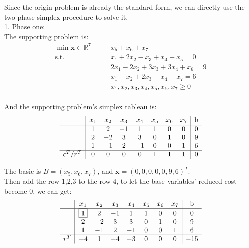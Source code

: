 \documentclass[10pt]{article}
\renewcommand{\mathbf}{\boldsymbol}
\begin{document}
Since the origin problem is already the standard form, we can directly use the two-phase simplex procedure to solve it.\\
1. Phase one:\\
The supporting problem is:\\
\begin{equation}
	\begin{aligned}
		\min{\bm{x} \in \mathbb{R}^{7}}\qquad & x_5 + x_6 + x_7 \\
		\mathrm{s.t.}\qquad & x_{1} + 2x_{2} - x_{3} + x_{4} + x_5 = 0 \\
							& 2x_{1} - 2x_{2} + 3x_{3} + 3x_{4} + x_6 = 9 \\
							& x_{1} - x_{2} + 2x_{3} - x_{4} + x_7 = 6 \\
							& x_{1}, x_{2}, x_{3}, x_{4}, x_5, x_6, x_7 \geq 0 \\
	\end{aligned}
\end{equation}

And the supporting problem's simplex tableau is:\\
\begin{equation}
	\begin{aligned}
		\begin{array}{c|ccccccc|c}
			& x_1 & x_2 & x_3 & x_4 & x_5 & x_6 & x_7 & \text{b} \\
			\hline
			& 1 & 2 & -1 & 1 & 1 & 0 & 0 & 0 \\
			& 2 & -2 & 3 & 3 & 0 & 1 & 0 & 9 \\
			& 1 & -1 & 2 & -1 & 0 & 0 & 1 & 6 \\
			\hline
			c^T/r^T & 0 & 0 & 0 & 0 & 1 & 1 & 1 & 0 \\
		\end{array}
	\end{aligned}
\end{equation}

The basic is $B=(x_5,x_6,x_7)$, and $\mathbf{x}=(0,0,0,0,0,9,6)^T$.\\
Then add the row 1,2,3 to the row 4, to let the base variables' reduced cost become $0$, we can get:\\
\begin{equation}
	\begin{aligned}
		\begin{array}{c|ccccccc|c}
			& x_1 & x_2 & x_3 & x_4 & x_5 & x_6 & x_7 & \text{b} \\
			\hline
			& \boxed{1} & 2 & -1 & 1 & 1 & 0 & 0 & 0 \\
			& 2 & -2 & 3 & 3 & 0 & 1 & 0 & 9 \\
			& 1 & -1 & 2 & -1 & 0 & 0 & 1 & 6 \\
			\hline
			r^T & -4 & 1 & -4 & -3 & 0 & 0 & 0 & -15 \\
		\end{array}
	\end{aligned}
\end{equation}
\end{document}
